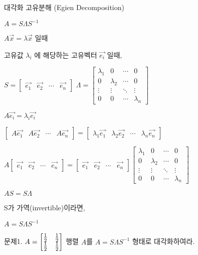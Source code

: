 \begin{definition} 
대각화 고유분해 (Egien Decomposition)

$A = S\Lambda S^{-1}$

$A\vec{x} = \lambda\vec{x}$ 일때

고유값 $\lambda_{i}$ 에 해당하는 고유벡터  $\vec{e_i}$ 일때,

$S=\begin{bmatrix} \vec{e_1} & \vec{e_2} & \cdots & \vec{e_n} \end{bmatrix}$  $ \Lambda = \begin{bmatrix} \lambda_1 & 0 & \cdots & 0 \\ 0 & \lambda_2& \cdots&0 \\ \vdots&\vdots& \ddots & \vdots \\ 0 &0&\cdots&\lambda_n  \end{bmatrix}$

$A\vec{e_i} = \lambda_i\vec{e_i} $

$\begin{bmatrix}A\vec{e_1} &A\vec{e_2}&\cdots&A\vec{e_n} \end{bmatrix} = \begin{bmatrix}\lambda_1\vec{e_1} &\lambda_2\vec{e_2}&\cdots&\lambda_n\vec{e_n} \end{bmatrix}$

$A\begin{bmatrix}\vec{e_1} &\vec{e_2}&\cdots&\vec{e_n} \end{bmatrix} = \begin{bmatrix}\vec{e_1} &\vec{e_2}&\cdots&\vec{e_n} \end{bmatrix}\begin{bmatrix} \lambda_1 & 0 & \cdots & 0 \\ 0 & \lambda_2& \cdots&0 \\ \vdots&\vdots& \ddots & \vdots \\ 0 &0&\cdots&\lambda_n  \end{bmatrix}$

$AS=S\Lambda$

S가 가역(invertible)이라면,

$A = S\Lambda S^{-1}$
\end{definition}

\newpage
문제1. $A=\begin{bmatrix}{1 \over 2} & {1 \over 2} \\ {1 \over 2} & {1 \over 2}\end{bmatrix}$ 행렬 $A$를 $A = S\Lambda S^{-1}$ 형태로 대각화하여라.



